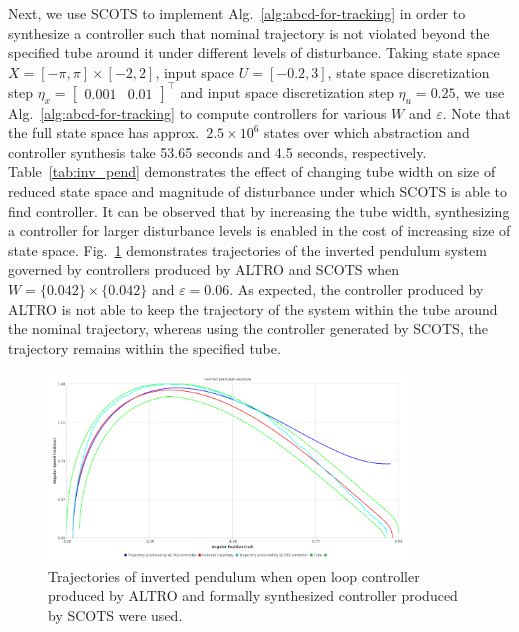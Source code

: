 Next, we use SCOTS to implement Alg.~\ref{alg:abcd-for-tracking} in order to synthesize a controller such that nominal trajectory is not violated beyond the specified tube around it under different levels of disturbance. Taking state space $X=[-\pi,\pi]\times[-2,2]$, input space $U=[-0.2,3]$, state space discretization step $\eta_x=\begin{bmatrix}0.001&0.01\end{bmatrix}^\top$ and input space discretization step $\eta_u=0.25$, we use Alg.~\ref{alg:abcd-for-tracking} to compute controllers for various $W$ and $\varepsilon$. Note that the full state space has approx.\ $2.5\times 10^6$ states over which abstraction and controller synthesis take 53.65 seconds and 4.5 seconds, respectively. Table~\ref{tab:inv_pend} demonstrates the effect of changing tube width on size of reduced state space and magnitude of disturbance under which SCOTS is able to find controller. It can be observed that by increasing the tube width, synthesizing a controller for larger disturbance levels is enabled in the cost of increasing size of state space. Fig.~\ref{fig:invpend_traj} demonstrates trajectories of the inverted pendulum system governed by controllers produced by ALTRO and SCOTS when $W=\{0.042\}\times \{0.042\}$ and $\varepsilon=0.06$. As expected, the controller produced by ALTRO is not able to keep the trajectory of the system within the tube around the nominal trajectory, whereas using the controller generated by SCOTS, the trajectory remains within the specified tube.
\begin{figure}[t]\label{fig:invpend_traj}
	\centering
	\includegraphics[width=0.85\textwidth]{traj_inv_pend.png}
	\caption{Trajectories of inverted pendulum when open loop controller produced by ALTRO and formally synthesized controller produced by SCOTS were used.}
\end{figure}
